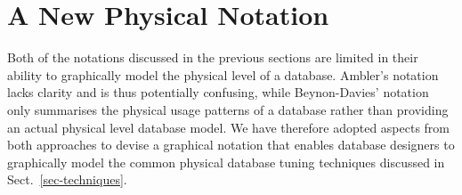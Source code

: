\documentclass{llncs}
\begin{document}
% 
% 


\section{A New Physical Notation}
\label{sec-notation}

Both of the notations discussed in the previous sections are limited in
their ability to graphically model the physical level of a database.
Ambler's notation lacks clarity and is thus potentially confusing, while
Beynon-Davies' notation only summarises the physical usage patterns of a
database rather than providing an actual physical level database model.
We have therefore adopted aspects from both approaches to devise a
graphical notation that enables database designers to graphically model
the common physical database tuning techniques discussed in
Sect.~\ref{sec-techniques}.
\end{document}
